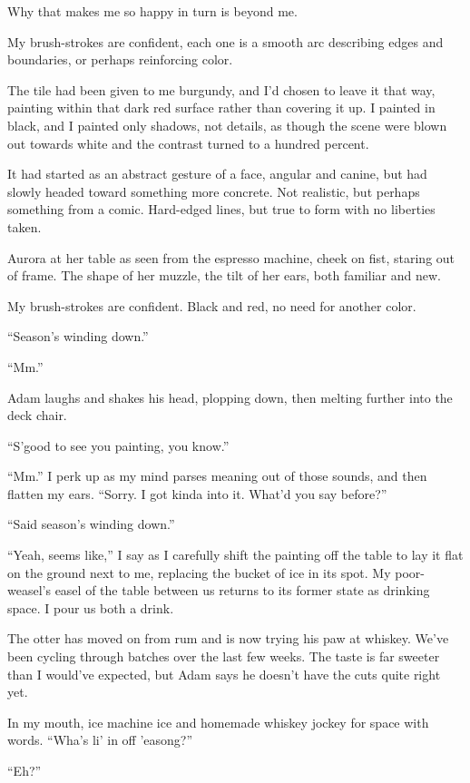 Why that makes me so happy in turn is beyond me.

\secdiv{}

\noindent My brush-strokes are confident, each one is a smooth arc describing edges and boundaries, or perhaps reinforcing color.

The tile had been given to me burgundy, and I'd chosen to leave it that way, painting within that dark red surface rather than covering it up. I painted in black, and I painted only shadows, not details, as though the scene were blown out towards white and the contrast turned to a hundred percent.

It had started as an abstract gesture of a face, angular and canine, but had slowly headed toward something more concrete. Not realistic, but perhaps something from a comic. Hard-edged lines, but true to form with no liberties taken.

Aurora at her table as seen from the espresso machine, cheek on fist, staring out of frame. The shape of her muzzle, the tilt of her ears, both familiar and new.

My brush-strokes are confident. Black and red, no need for another color.

``Season's winding down.''

``Mm.''

Adam laughs and shakes his head, plopping down, then melting further into the deck chair.

``S'good to see you painting, you know.''

``Mm.'' I perk up as my mind parses meaning out of those sounds, and then flatten my ears. ``Sorry. I got kinda into it. What'd you say before?''

``Said season's winding down.''

``Yeah, seems like,'' I say as I carefully shift the painting off the table to lay it flat on the ground next to me, replacing the bucket of ice in its spot. My poor-weasel's easel of the table between us returns to its former state as drinking space. I pour us both a drink.

The otter has moved on from rum and is now trying his paw at whiskey. We've been cycling through batches over the last few weeks. The taste is far sweeter than I would've expected, but Adam says he doesn't have the cuts quite right yet.

In my mouth, ice machine ice and homemade whiskey jockey for space with words. ``Wha's li' in off 'easong?''

``Eh?''

